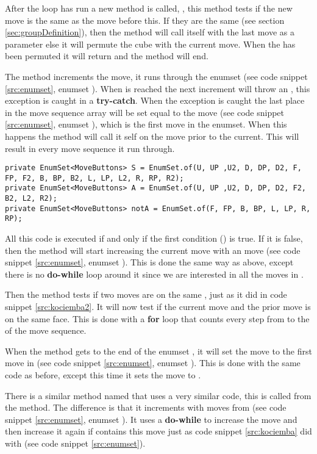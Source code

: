 After the loop has run a new method is called, , this method tests if the new move is the same as the move before this.
If they are the same (see section \ref{sec:groupDefinition}), then the method will call itself with the last move as a parameter else it will permute the cube with the current move.
When the \rubik{} has been permuted it will return and the method will end.

The method increments the move, it runs through the enumset  (see code snippet \ref{src:enumset}, enumset ).
When  is reached the next increment will throw an , this exception is caught in a \textbf{try-catch}.
When the exception is caught the last place in the move sequence array will be set equal to the move (see code snippet \ref{src:enumset}, enumset ), which is the first move in the enumset.
When this happens the method will call it self on the move prior to the current. This will result in every move sequence it run through. 



\begin{lstlisting}[style=sourceCode, caption=\myCaption{The definition of the enumsets S, A, and notA.}, label=src:enumset]
private EnumSet<MoveButtons> S = EnumSet.of(U, UP ,U2, D, DP, D2, F, FP, F2, B, BP, B2, L, LP, L2, R, RP, R2);
private EnumSet<MoveButtons> A = EnumSet.of(U, UP ,U2, D, DP, D2, F2, B2, L2, R2);
private EnumSet<MoveButtons> notA = EnumSet.of(F, FP, B, BP, L, LP, R, RP);
\end{lstlisting}

All this code is executed if and only if the first condition () is true.
If it is false, then the method will start increasing the current move with an  move (see code snippet \ref{src:enumset}, enumset ).
This is done the same way as above, except there is no \textbf{do-while} loop around it since we are interested in all the moves in .

Then the method tests if two moves are on the same \face{}, just as it did in code snippet \ref{src:kociemba2}.
It will now test if the current move and the prior move is on the same face.
This is done with a \textbf{for} loop that counts every step from  to the  of the move sequence.

When the method gets to the end of the enumset , it will set the move to the first move in  (see code snippet \ref{src:enumset}, enumset ).
This is done with the same code as before, except this time it sets the move to .

There is a similar method named  that uses a very similar code, this is called from the  method.
The difference is that it increments with moves from  (see code snippet \ref{src:enumset}, enumset ).
It uses a \textbf{do-while} to increase the move  and then increase it again if  contains this move just as code snippet \ref{src:kociemba} did with  (see code snippet \ref{src:enumset}).